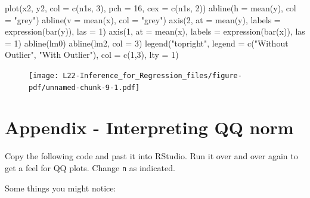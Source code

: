 \documentclass[
  letterpaper,
  DIV=11,
  numbers=noendperiod,
  oneside]{scrreprt}
\newenvironment{Shaded}{\begin{snugshade}}{\end{snugshade}}
\newcommand{\AttributeTok}[1]{\textcolor[rgb]{0.40,0.45,0.13}{#1}}
\newcommand{\DecValTok}[1]{\textcolor[rgb]{0.68,0.00,0.00}{#1}}
\newcommand{\FunctionTok}[1]{\textcolor[rgb]{0.28,0.35,0.67}{#1}}
\newcommand{\NormalTok}[1]{\textcolor[rgb]{0.00,0.23,0.31}{#1}}
\newcommand{\StringTok}[1]{\textcolor[rgb]{0.13,0.47,0.30}{#1}}
\begin{document}
\begin{Shaded}
\begin{Highlighting}[]
\FunctionTok{plot}\NormalTok{(x2, y2, }\AttributeTok{col =} \FunctionTok{c}\NormalTok{(n1s, }\DecValTok{3}\NormalTok{), }
    \AttributeTok{pch =} \DecValTok{16}\NormalTok{, }\AttributeTok{cex =} \FunctionTok{c}\NormalTok{(n1s, }\DecValTok{2}\NormalTok{))}
\FunctionTok{abline}\NormalTok{(}\AttributeTok{h =} \FunctionTok{mean}\NormalTok{(y), }\AttributeTok{col =} \StringTok{"grey"}\NormalTok{)}
\FunctionTok{abline}\NormalTok{(}\AttributeTok{v =} \FunctionTok{mean}\NormalTok{(x), }\AttributeTok{col =} \StringTok{"grey"}\NormalTok{)}
\FunctionTok{axis}\NormalTok{(}\DecValTok{2}\NormalTok{, }\AttributeTok{at =} \FunctionTok{mean}\NormalTok{(y), }\AttributeTok{labels =} \FunctionTok{expression}\NormalTok{(}\FunctionTok{bar}\NormalTok{(y)), }\AttributeTok{las =} \DecValTok{1}\NormalTok{)}
\FunctionTok{axis}\NormalTok{(}\DecValTok{1}\NormalTok{, }\AttributeTok{at =} \FunctionTok{mean}\NormalTok{(x), }\AttributeTok{labels =} \FunctionTok{expression}\NormalTok{(}\FunctionTok{bar}\NormalTok{(x)), }\AttributeTok{las =} \DecValTok{1}\NormalTok{)}
\FunctionTok{abline}\NormalTok{(lm0)}
\FunctionTok{abline}\NormalTok{(lm2, }\AttributeTok{col =} \DecValTok{3}\NormalTok{)}
\FunctionTok{legend}\NormalTok{(}\StringTok{"topright"}\NormalTok{, }\AttributeTok{legend =} \FunctionTok{c}\NormalTok{(}\StringTok{"Without Outlier"}\NormalTok{, }\StringTok{"With Outlier"}\NormalTok{), }\AttributeTok{col =} \FunctionTok{c}\NormalTok{(}\DecValTok{1}\NormalTok{,}\DecValTok{3}\NormalTok{), }\AttributeTok{lty =} \DecValTok{1}\NormalTok{)}
\end{Highlighting}
\end{Shaded}

\begin{figure}[H]

{\centering \texttt{[image: L22-Inference\_for\_Regression\_files/figure-pdf/unnamed-chunk-9-1.pdf]}

}

\end{figure}

\hypertarget{appendix---interpreting-qq-norm}{%
\section{Appendix - Interpreting QQ
norm}\label{appendix---interpreting-qq-norm}}

Copy the following code and past it into RStudio. Run it over and over
again to get a feel for QQ plots. Change \texttt{n} as indicated.

Some things you might notice:
\end{document}

